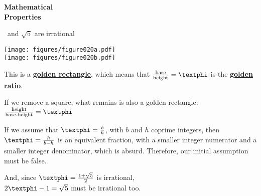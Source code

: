 \documentclass[14pt]{beamer}
\begin{document}

    \begin{frame}{}
        \begin{center}
            \textbf{\Huge Mathematical\\\bigskip Properties}\\
        \end{center}
    \end{frame}


    \begin{frame}{\textphi\ and $\sqrt{5}$ are irrational}
        \begin{center}
            \begin{minipage}{0.45\textwidth}%
                \texttt{[image: figures/figure020a.pdf]} \\[2ex]
                \texttt{[image: figures/figure020b.pdf]} \\
            \end{minipage}\hfill\begin{minipage}{0.5\textwidth}
                \footnotesize
                This is a \textbf{\href{https://en.wikipedia.org/wiki/Golden_rectangle}{golden rectangle}}, which means that $\tfrac{\text{base}}{\text{height}} = \text{\textphi}$ is the \textbf{\href{https://en.wikipedia.org/wiki/Golden_ratio}{golden ratio}}.\bigskip

                If we remove a square, what remains is also a golden rectangle: $\tfrac{\text{height}}{\text{base-height}} = \text{\textphi}$\bigskip

                If we assume that $\text{\textphi} = \tfrac{b}{h}$, with $b$ and $h$ coprime integers, then $\text{\textphi} = \tfrac{h}{b-h}$ is an equivalent fraction, with a smaller integer numerator and a smaller integer denominator, which is absurd. Therefore, our initial assumption must be false.\bigskip

                And, since $\text{\textphi} =\tfrac{1+\sqrt{5}}{2}$ is irrational,\\[0.25ex]$2\text{\textphi} - 1 = \sqrt{5}$ must be irrational too.
            \end{minipage}
        \end{center}
    \end{frame}
\end{document}
